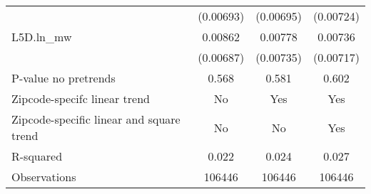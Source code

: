{\begin{tabular}{l*{3}{c}}
          &(0.00693)         &(0.00695)         &(0.00724)         \\
[1em]
L5D.ln\_mw &  0.00862         &  0.00778         &  0.00736         \\
          &(0.00687)         &(0.00735)         &(0.00717)         \\
\hline
P-value no pretrends&    0.568         &    0.581         &    0.602         \\
Zipcode-specifc linear trend&       No         &      Yes         &      Yes         \\
Zipcode-specific linear and square trend&       No         &       No         &      Yes         \\
R-squared &    0.022         &    0.024         &    0.027         \\
Observations&   106446         &   106446         &   106446         \\
\hline\hline
\end{tabular}
}
